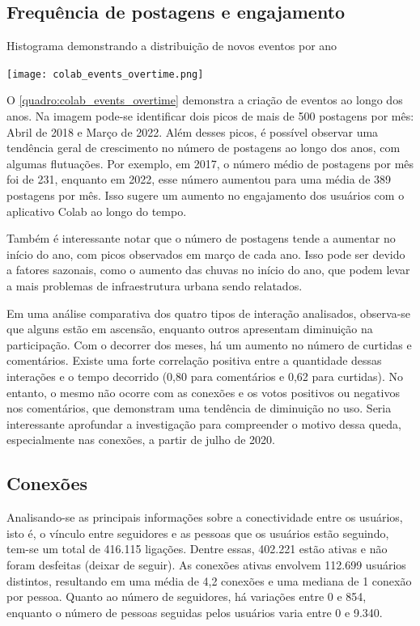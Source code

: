 \subsection*{Frequência de postagens e engajamento}
\label{sec:engajamento}

\begin{quadro}[htb]
	\caption{Histograma demonstrando a distribuição de novos eventos por ano}
	\label{quadro:colab_events_overtime}
	\centering
	\texttt{[image: colab\_events\_overtime.png]}
\end{quadro}

O \autoref{quadro:colab_events_overtime} demonstra a criação de eventos ao longo dos anos. Na imagem pode-se identificar dois picos de mais de 500 postagens por mês: Abril de 2018 e Março de 2022. Além desses picos, é possível observar uma tendência geral de crescimento no número de postagens ao longo dos anos, com algumas flutuações. Por exemplo, em 2017, o número médio de postagens por mês foi de 231, enquanto em 2022, esse número aumentou para uma média de 389 postagens por mês. Isso sugere um aumento no engajamento dos usuários com o aplicativo Colab ao longo do tempo.

Também é interessante notar que o número de postagens tende a aumentar no início do ano, com picos observados em março de cada ano. Isso pode ser devido a fatores sazonais, como o aumento das chuvas no início do ano, que podem levar a mais problemas de infraestrutura urbana sendo relatados.

Em uma análise comparativa dos quatro tipos de interação analisados, observa-se que alguns estão em ascensão, enquanto outros apresentam diminuição na participação. Com o decorrer dos meses, há um aumento no número de curtidas e comentários. Existe uma forte correlação positiva entre a quantidade dessas interações e o tempo decorrido (0,80 para comentários e 0,62 para curtidas). No entanto, o mesmo não ocorre com as conexões e os votos positivos ou negativos nos comentários, que demonstram uma tendência de diminuição no uso. Seria interessante aprofundar a investigação para compreender o motivo dessa queda, especialmente nas conexões, a partir de julho de 2020.

\subsection*{Conexões}

Analisando-se as principais informações sobre a conectividade entre os usuários, isto é, o vínculo entre seguidores e as pessoas que os usuários estão seguindo, tem-se um total de 416.115 ligações. Dentre essas, 402.221 estão ativas e não foram desfeitas (deixar de seguir). As conexões ativas envolvem 112.699 usuários distintos, resultando em uma média de 4,2 conexões e uma mediana de 1 conexão por pessoa. Quanto ao número de seguidores, há variações entre 0 e 854, enquanto o número de pessoas seguidas pelos usuários varia entre 0 e 9.340.

